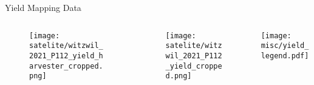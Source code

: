 \begin{frame}{Yield Mapping Data}
	\begin{columns}
		
		\begin{column}{0.42\textwidth}
			\begin{figure}
				\texttt{[image: satelite/witzwil\_2021\_P112\_yield\_harvester\_cropped.png]}
			\end{figure}
		\end{column}
		\begin{column}{0.42\textwidth}
			\begin{figure}
				\texttt{[image: satelite/witzwil\_2021\_P112\_yield\_cropped.png]}
			\end{figure}
		\end{column}
		\begin{column}{0.14\textwidth}
			\texttt{[image: misc/yield\_legend.pdf]}
		\end{column}		
	\end{columns}

\end{frame}
